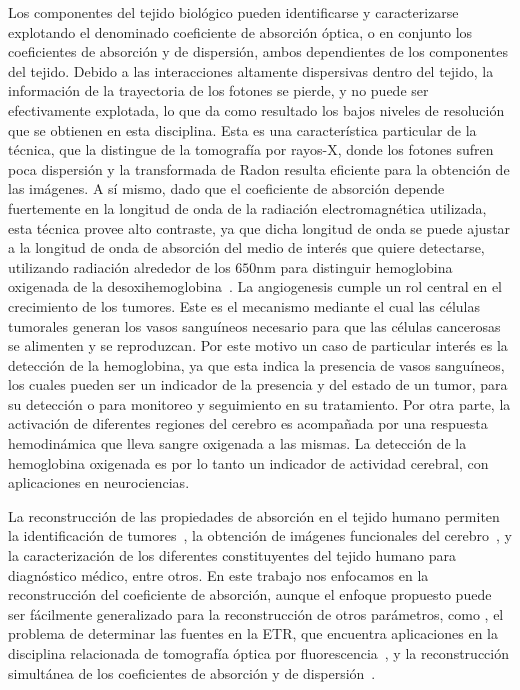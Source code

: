  Los componentes del tejido biológico pueden identificarse y caracterizarse
 explotando el denominado coeficiente de absorción óptica, o en conjunto 
 los coeficientes de absorción y de dispersión, ambos dependientes 
 de los componentes del tejido.
 Debido a las interacciones altamente dispersivas dentro del tejido,
 la información de la trayectoria de los fotones se pierde, y no puede ser efectivamente explotada,
 lo que da como resultado los bajos niveles de resolución que se obtienen en esta disciplina. 
 Esta es una característica particular de la técnica, que la distingue de la tomografía 
 por rayos-X, donde los fotones sufren poca dispersión y la transformada de 
Radon resulta eficiente para la obtención de las imágenes. A sí mismo, 
 dado que el coeficiente de absorción depende fuertemente en la longitud de onda 
 de la radiación electromagnética utilizada, esta técnica provee alto contraste, 
 ya que dicha longitud de onda se puede ajustar a la longitud de onda de absorción 
 del medio de interés que quiere detectarse, \eg utilizando radiación alrededor de los $650$nm 
 para distinguir hemoglobina oxigenada de la desoxihemoglobina~\cite{Boas2001}. La angiogenesis 
 cumple un rol central en el crecimiento de los tumores. Este es 
 el mecanismo mediante el cual las células tumorales generan los vasos sanguíneos 
 necesario para que las células cancerosas se alimenten y se reproduzcan. Por este 
 motivo un caso de particular interés es la detección de la hemoglobina, ya que esta indica la presencia de vasos sanguíneos, los cuales pueden ser un indicador de la presencia y del estado de un tumor, para su detección o para monitoreo y seguimiento en su tratamiento. 
 Por otra parte, 
 la activación de diferentes regiones del cerebro 
 es acompañada por una respuesta hemodinámica que lleva sangre oxigenada 
 a las mismas. La detección de la hemoglobina 
 oxigenada es por lo tanto un indicador de actividad cerebral, con aplicaciones 
 en neurociencias. 
 
 La reconstrucción de las propiedades de absorción en el tejido humano permiten la identificación de tumores~\cite{Zhu2005, Zhu2010, Fujii2016b},
 la obtención de imágenes funcionales del cerebro~\cite{Boas2001, bluestone2001, Arridge1999}, y la caracterización de los diferentes
 constituyentes del tejido humano para diagnóstico médico, entre otros. En este trabajo nos enfocamos en
 la reconstrucción del coeficiente de absorción, aunque
 el enfoque propuesto puede ser fácilmente generalizado para la reconstrucción 
 de otros parámetros, como \eg, el problema de determinar las fuentes en la ETR,
 que encuentra aplicaciones en la disciplina relacionada de
 tomografía óptica por fluorescencia~\cite{Klose2005,Klose2010, Ren2010}, y la reconstrucción 
 simultánea de los coeficientes de absorción y de dispersión~\cite{Ren2006,Prieto2017}.

